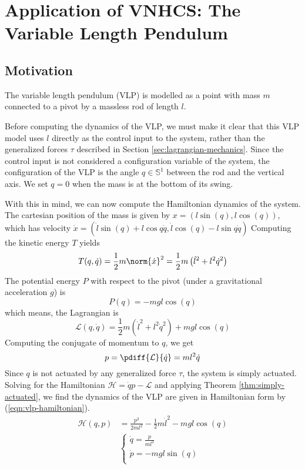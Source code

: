
\chapter{Application of VNHCS: The Variable Length Pendulum}\label{sec:vlp}
\section{Motivation}
The variable length pendulum (VLP) is modelled as a point with mass \(m\)
connected to a pivot by a massless rod of length \(l\).


Before computing the dynamics of the VLP, we must make it clear that this
VLP model uses \(l\) directly as the control input to the system, rather than the
generalized forces \(\tau\) described in Section \ref{sec:lagrangian-mechanics}.
Since the control input is not considered a configuration variable of the
system, the configuration of the VLP is
the angle \(q \in \mathbb{S}^1\) between the rod and the vertical axis. We set
\(q = 0\) when the mass is at the bottom of its swing.

With this in mind, we can now compute the Hamiltonian dynamics of the system.
The cartesian position of the mass is given by \(x = (l\sin(q),l\cos(q))\),
which has velocity 
\(\dot{x} = (\dot{l}\sin(q) + l\cos{q}\dot{q}, \dot{l}\cos(q) - l\sin{q}\dot{q})\)
Computing the kinetic energy \(T\) yields
\[
   T(q,\dot{q}) = \frac{1}{2}m\norm{\dot{x}}^2 = \frac{1}{2}m\left(\dot{l}^2 +
   l^2\dot{q}^2\right)
\]
The potential energy \(P\) with respect to the pivot (under a gravitational
acceleration \(g\)) is
\[
   P(q) = -mgl\cos(q)
\]
which means, the Lagrangian is
\[
   \mathcal{L}(q,\dot{q}) = \frac{1}{2}m\left(\dot{l}^2 + l^2\dot{q}^2\right)
      + mgl\cos(q)
\]
Computing the conjugate of momentum to \(q\), we get 
\[
   p = \pdiff{\mathcal{L}}{\dot{q}} = ml^2\dot{q}
\]
Since \(q\) is not actuated by any generalized force \(\tau\), the system
is simply actuated. 
Solving for the Hamiltonian \(\mathcal{H} = \dot{q}p - \mathcal{L}\)
and applying Theorem \ref{thm:simply-actuated}, we find the dynamics of the VLP
are given in Hamiltonian form by (\ref{eqn:vlp-hamiltonian}). 
\begin{align}\label{eqn:vlp-hamiltonian}
   \mathcal{H}(q,p) &= \frac{p^2}{2ml^2} - \frac{1}{2}m\dot{l}^2 - mgl\cos(q) \\
     &\begin{cases}
        \dot{q} = \frac{p}{ml^2} \\
        \dot{p} = -mgl\sin(q) \\
   \end{cases} \nonumber
\end{align}


